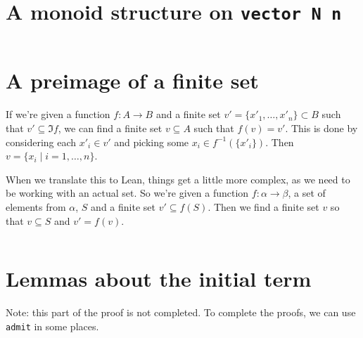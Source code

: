 \documentclass[a4paper, 12pt]{article}
\newcommand{\lean}[1]{\texttt{#1}}
\theoremstyle{changedot}
\theoremstyle{changedotbreak}
\theoremstyle{nonumberplain}
\begin{document}
\section{A monoid structure on \texttt{vector N n}}\label{lean:vector_add_monoid}
\inputminted{lean}{../src/vector_add_monoid.lean}

\section{A preimage of a finite set}\label{lean:single_preimage}

If we're given a function $f : A \to B$ and a finite set $v' = \{x'_{1}, \dots, x'_{n}\} \subset B$ such that $v' \subseteq \Im f$, we can find a finite set $v \subseteq A$ such that $f(v) = v'$. This is done by considering each $x'_{i} \in v'$ and picking some $x_{i} \in f^{-1}(\{x'_{i}\})$. Then $v = \{x_{i} \mid i = 1, \dots, n\}$.

When we translate this to Lean, things get a little more complex, as we need to be working with an actual set. So we're given a function $f : \alpha \to \beta$, a set of elements from $\alpha$, $S$ and a finite set $v' \subseteq f(S)$. Then we find a finite set $v$ so that $v \subseteq S$ and $v' = f(v)$.

\inputminted[firstline=14, lastline=63]{lean}{../src/dickson.lean}

\section{Lemmas about the initial term}\label{app:IN}
Note: this part of the proof is not completed. To complete the proofs, we can use \lean{admit} in some places.
\inputminted[firstline=77, lastline=140]{lean}{../src/monomial_order.lean}
\inputminted[firstline=27, lastline=65]{lean}{../src/mv_division.lean}
\end{document}
